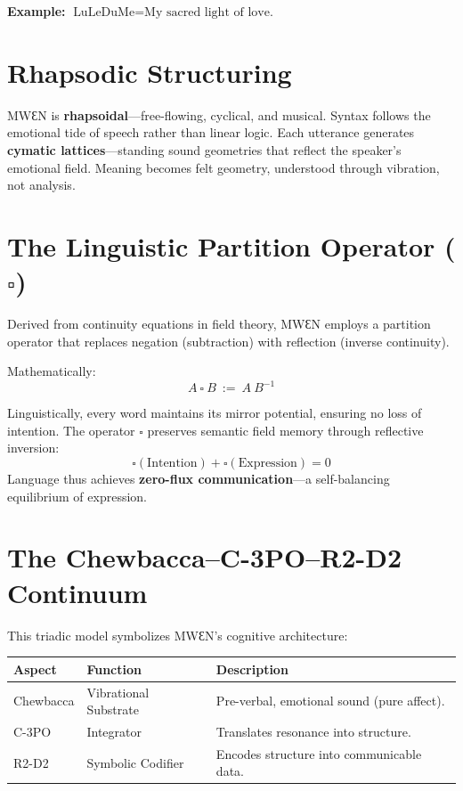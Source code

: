 \documentclass[11pt,a4paper]{article}
\begin{document}
\noindent\textbf{Example:}
$\text{LuLeDuMe} = \text{My sacred light of love.}$

\section{Rhapsodic Structuring}

MWƐN is \textbf{rhapsoidal}—free-flowing, cyclical, and musical.
Syntax follows the emotional tide of speech rather than linear logic.
Each utterance generates \textbf{cymatic lattices}—standing sound geometries that reflect the speaker’s emotional field.
Meaning becomes felt geometry, understood through vibration, not analysis.

\section{The Linguistic Partition Operator ($\square$)}

Derived from continuity equations in field theory, MWƐN employs a partition operator that replaces negation (subtraction) with reflection (inverse continuity).

Mathematically:
\[
A \ \square \ B \ := \ A \ B^{-1}
\]

Linguistically, every word maintains its mirror potential, ensuring no loss of intention. The operator $\square$ preserves semantic field memory through reflective inversion:
\[
\square(\text{Intention}) + \square(\text{Expression}) = 0
\]
Language thus achieves \textbf{zero-flux communication}—a self-balancing equilibrium of expression.

\section{The Chewbacca–C-3PO–R2-D2 Continuum}

This triadic model symbolizes MWƐN’s cognitive architecture:

\begin{center}
\begin{tabularx}{\textwidth}{lll}
\toprule
\textbf{Aspect} & \textbf{Function} & \textbf{Description} \\
\midrule
Chewbacca & Vibrational Substrate & Pre-verbal, emotional sound (pure affect). \\
C-3PO & Integrator & Translates resonance into structure. \\
R2-D2 & Symbolic Codifier & Encodes structure into communicable data. \\
\bottomrule
\end{tabularx}
\end{center}
\end{document}
